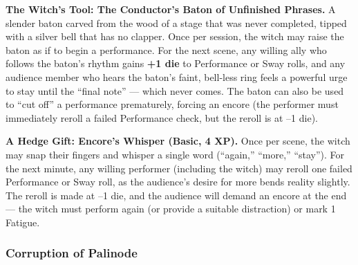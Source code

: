 \textbf{The Witch's Tool: The Conductor's Baton of Unfinished Phrases.} A slender baton carved from the wood of a stage that was never completed, tipped with a silver bell that has no clapper. Once per session, the witch may raise the baton as if to begin a performance. For the next scene, any willing ally who follows the baton's rhythm gains \textbf{+1 die} to Performance or Sway rolls, and any audience member who hears the baton's faint, bell-less ring feels a powerful urge to stay until the ``final note'' --- which never comes. The baton can also be used to ``cut off'' a performance prematurely, forcing an encore (the performer must immediately reroll a failed Performance check, but the reroll is at --1 die).

\textbf{A Hedge Gift: Encore's Whisper (Basic, 4 XP).} Once per scene, the witch may snap their fingers and whisper a single word (``again,'' ``more,'' ``stay''). For the next minute, any willing performer (including the witch) may reroll one failed Performance or Sway roll, as the audience's desire for more bends reality slightly. The reroll is made at --1 die, and the audience will demand an encore at the end --- the witch must perform again (or provide a suitable distraction) or mark 1 Fatigue.

\subsubsection*{Corruption of Palinode}

